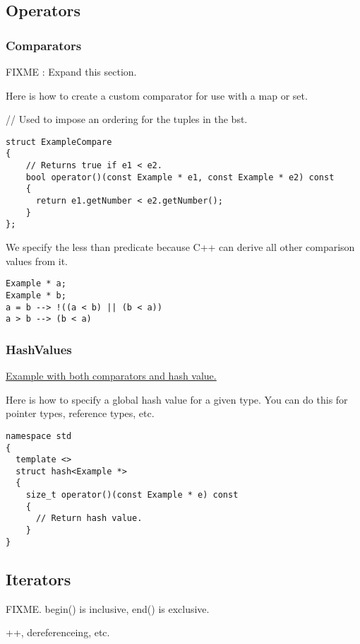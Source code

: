 \documentclass[12pt, letterpaper]{article}
\begin{document}
\subsection{Operators}

\subsubsection{Comparators}

FIXME : Expand this section.

Here is how to create a custom comparator for use with a map or set.

// Used to impose an ordering for the tuples in the bst.
\begin{verbatim}
struct ExampleCompare
{
    // Returns true if e1 < e2.
    bool operator()(const Example * e1, const Example * e2) const
    {
      return e1.getNumber < e2.getNumber();
    }
};
\end{verbatim}

We specify the less than predicate because C++ can derive all other comparison values from it.
\begin{verbatim}
Example * a;
Example * b;
a = b --> !((a < b) || (b < a))
a > b --> (b < a)
\end{verbatim}

\subsubsection{HashValues}

\href{https://github.com/Bryce-Summers/Randomized_Acyclic_Connected_Sub_Graphs/blob/master/Mazes/include/Edge.h}{Example with both comparators and hash value.}

Here is how to specify a global hash value for a given type. You can do this for pointer types, reference types, etc.

\begin{verbatim}
namespace std
{
  template <>
  struct hash<Example *>
  {
    size_t operator()(const Example * e) const
    {
      // Return hash value.
    }
}
\end{verbatim}

\subsection{Iterators}

FIXME.
begin() is inclusive, end() is exclusive.

++, dereferenceing, etc.
\end{document}
